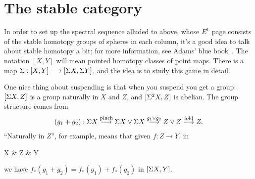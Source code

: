 
\begin{center}
\end{center}

\section{The stable category} %
\label{TheStableCategory}
\ifx\OutputTheStableCategory\undefined\else
In order to set up the spectral sequence alluded to above, whose $E^1$ page consists of the stable homotopy groups of spheres in each column, it's a good idea to talk about stable homotopy a bit; for more information, see Adams' blue book~\cite{Adams}.  The notation $[X, Y]$ will mean pointed homotopy classes of point maps.  There is a map $\Sigma: [X, Y] \longrightarrow [\Sigma X, \Sigma Y]$, and the idea is to study this game in detail.

One nice thing about suspending is that when you suspend you get a group: $[\Sigma X, Z]$ is a group naturally in $X$ and $Z$, and $[\Sigma^2 X, Z]$ is abelian.  The group structure comes from
\[
(g_1 + g_2): \Sigma X \stackrel{\textup{pinch}}{\longrightarrow} \Sigma X \vee \Sigma X \stackrel{g_1 \vee g_2}{\longrightarrow} Z \vee Z \stackrel{\textup{fold}}{\longrightarrow} Z
.\]
``Naturally in $Z$'', for example, means that given $f: Z \to Y$, in
\begin{ctikzcd}
\Suspend X \rar["g_1",yshift=0.3em] \rar["g_2"',yshift=-0.3em] & Z  & Y
\end{ctikzcd}
we have $f_*(g_1 + g_2) = f_* (g_1) + f_* (g_2)$ in $[\Sigma X, Y]$.

